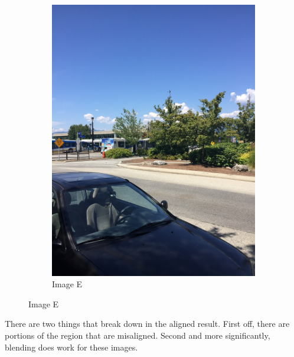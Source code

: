 \documentclass[]{article}
\begin{document}
\begin{figure}[h]
\begin{subfigure}[h]{0.2\textwidth}
		\includegraphics[scale=0.15]{results/5}
		\centering
		\caption{Image E}
	\end{subfigure}%
	\centering
\end{figure}

There are two things that break down in the aligned result. First off, there are portions of the region that are misaligned. Second and more significantly, blending does work for these images.
\vspace{30mm}
\end{document}
